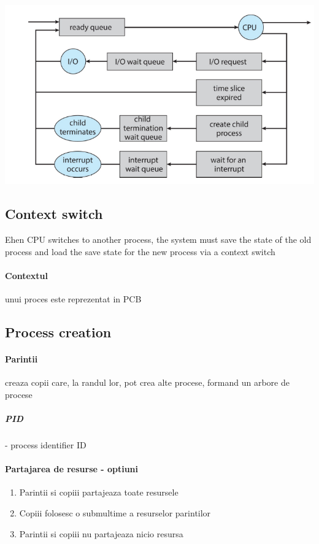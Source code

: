 \documentclass{article}
\begin{document}
\begin{center}
    \includegraphics[scale=0.3]{4_indepthprocsched.png}
\end{center}

\subsection*{Context switch} Ehen CPU switches to another process, the system must save the state of the old process and load the save state for the new process via a context switch
\paragraph*{Contextul} unui proces este reprezentat in PCB

\subsection*{Process creation}
\paragraph*{Parintii} creaza copii care, la randul lor, pot crea alte procese, formand un arbore de procese
\subparagraph*{PID} - process identifier ID
\paragraph*{Partajarea de resurse - optiuni}
\begin{enumerate}
    \item Parintii si copiii partajeaza toate resursele
    \item Copiii folosesc o submultime a resurselor parintilor
    \item Parintii si copiii nu partajeaza nicio resursa
\end{enumerate}
\end{document}
